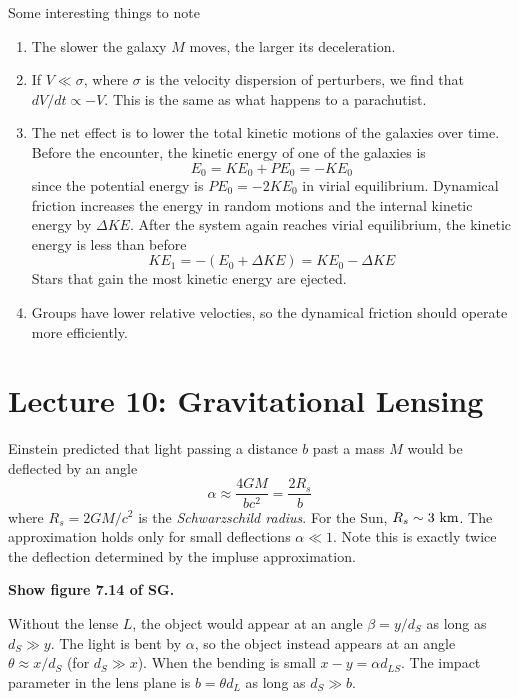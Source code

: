 \documentclass[]{article}
\begin{document}
Some interesting things to note
\begin{enumerate}
\item The slower the galaxy $M$ moves, the larger its deceleration.
\item If $V\ll\sigma$, where $\sigma$ is the velocity dispersion of perturbers, we find that $dV/dt\propto -V$.  This is the same as what happens to a parachutist.
\item The net effect is to lower the total kinetic motions of the galaxies over time.
Before the encounter, the kinetic energy of one of the galaxies is
\begin{equation}
E_0 = KE_0 + PE_0 = - KE_0
\end{equation}
\noindent
since the potential energy is $ PE_0 = - 2KE_0$ in virial equilibrium.
Dynamical friction increases the energy in random motions and the internal kinetic
energy by $\Delta KE$.  After the system again reaches virial equilibrium,
the kinetic energy is less than before
\begin{equation}
KE_1  = - (E_0 + \Delta KE) = KE_0 - \Delta KE
\end{equation}
\noindent
Stars that gain the most kinetic energy are ejected.
\item Groups have lower relative velocties, so the dynamical
friction should operate more efficiently.
\end{enumerate}



\section{Lecture 10: Gravitational Lensing}

Einstein predicted that light passing a distance $b$
past a mass $M$ would be deflected by an angle
\begin{equation}
\label{eqn:alpha_grav_lens}
\alpha \approx \frac{4GM}{bc^2} = \frac{2R_s}{b}
\end{equation}
\noindent
where $R_s = 2 GM/c^2$ is the {\it Schwarzschild radius}.
For the Sun, $R_s\sim3~\mathrm{km}$. The approximation
holds only for small deflections $\alpha\ll1$.
Note this is exactly twice the deflection determined by 
the impluse approximation.

{\bf Show figure 7.14 of SG.}

Without the lense $L$, the object would appear at an angle
$\beta = y/d_{S}$ as long as $d_{S} \gg y$.
The light is bent by $\alpha$, so the object instead appears
at an angle $\theta \approx x/d_S$ (for $d_S \gg x$).
When the bending is small $x-y = \alpha d_{LS}$.
The impact parameter in the lens plane is $b = \theta d_{L}$
as long as $d_S \gg b$.
\end{document}
